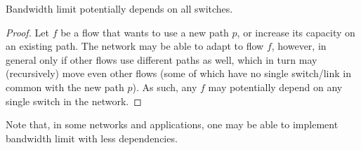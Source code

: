 \begin{lemma}\label{lemma:imp bandwidth limit} Bandwidth limit potentially depends on all switches.
\end{lemma}

\begin{proof} Let $f$ be a flow that wants to use a new path $p$, or increase its capacity on an existing path. The network may be able to adapt to flow $f$, however, in general only if other flows use different paths as well, which in turn may (recursively) move even other flows (some of which have no single switch/link in common with the new path $p$). As such, any $f$ may potentially depend on any single switch in the network.
\end{proof}

Note that, in some networks and applications, one may be able to implement bandwidth limit with less dependencies.
